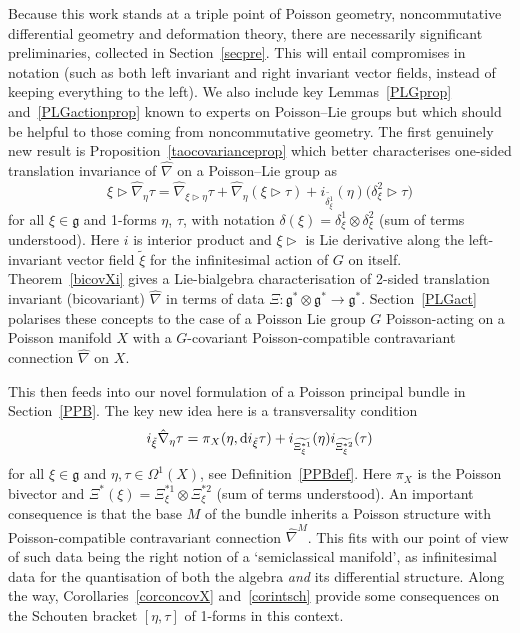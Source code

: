 \documentclass[pdftex]{sigma}
\numberwithin{equation}{section}
\newcommand{\<}{{\langle}}
\renewcommand{\>}{{\rangle}}
\newcommand{\tens}{\otimes}
\newcommand{\extd}{{\rm d}}
\newcommand{\la}{{\triangleright}}
\newcommand{\cg}{{\mathfrak{g}}}
\begin{document}
Because this work stands at a triple point of Poisson geometry, noncommutative differential geometry and deformation theory, there are necessarily significant preliminaries, collected in Section~\ref{secpre}. This will entail compromises in notation (such as both left invariant and right invariant vector fields, instead of keeping everything to the left). We also include key Lemmas~\ref{PLGprop} and~\ref{PLGactionprop} known to experts on Poisson--Lie groups but which should be helpful to those coming from noncommutative geometry. The first genuinely new result is Proposition~\ref{taocovarianceprop} which better characterises one-sided translation invariance of $\hat\nabla$ on a Poisson--Lie group as
\[ \xi\la\hat\nabla_{\eta}\tau=\hat\nabla_{\xi\la\eta}\tau+\hat\nabla_{\eta}(\xi\la\tau) +i_{\tilde{\delta_\xi^1}}(\eta)\big(\delta_\xi^2\la\tau\big)\]
for all $\xi\in\cg$ and 1-forms $\eta$, $\tau$, with notation $\delta(\xi)=\delta^1_\xi\tens\delta^2_\xi$ (sum of terms understood). Here $i$ is interior product and $\xi\la$ is Lie derivative along the left-invariant vector field $\tilde\xi$ for the infinitesimal action of $G$ on itself. Theorem~\ref{bicovXi} gives a Lie-bialgebra characterisation of 2-sided translation invariant (bicovariant) $\hat\nabla$ in terms of data $\Xi\colon \cg^*\tens\cg^*\to \cg^*$. Section~\ref{PLGact} polarises these concepts to the case of a Poisson Lie group $G$ Poisson-acting on a Poisson manifold $X$ with a $G$-covariant Poisson-compatible contravariant connection $\hat\nabla$ on $X$.

This then feeds into our novel formulation of a Poisson principal bundle in Section~\ref{PPB}. The key new idea here is a transversality condition
\[ i_{\tilde\xi}\hat\nabla_\eta\tau=\pi_X(\eta,\extd i_{\tilde\xi}\tau)+i_{\widetilde{\Xi_\xi^{*1}}}(\eta) i_{\widetilde{\Xi_\xi^{*2}}}(\tau)\]
for all $\xi\in \cg$ and $\eta,\tau \in \Omega^1(X)$, see Definition~\ref{PPBdef}. Here $\pi_X$ is the Poisson bivector and $\Xi^*(\xi)=\Xi_\xi^{*1}\tens \Xi_\xi^{*2}$ (sum of terms understood). An important consequence is that the base $M$ of the bundle inherits a Poisson structure with Poisson-compatible contravariant connection $\hat\nabla^M$. This fits with our point of view of such data being the right notion of a `semiclassical manifold', as infinitesimal data for the quantisation of both the algebra {\em and} its differential structure. Along the way, Corollaries~\ref{corconcovX} and~\ref{corintsch} provide some consequences on the Schouten bracket $[\eta,\tau]$ of 1-forms in this context.
\end{document}
